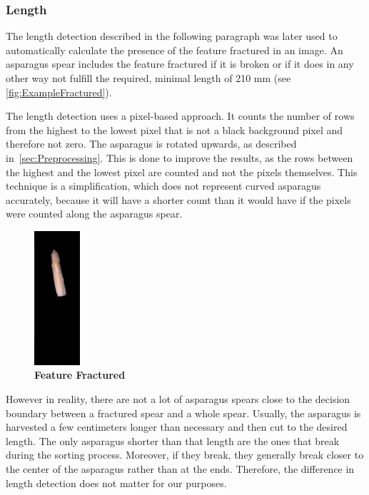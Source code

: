 \subsubsection{Length}
\label{subsec:Length}

The length detection described in the following paragraph was later used to automatically calculate the presence of the feature fractured in an image. An asparagus spear includes the feature fractured if it is broken or if it does in any other way not fulfill the required, minimal length of 210 mm (see \autoref{fig:ExampleFractured}). 

\bigskip
The length detection uses a pixel-based approach. It counts the number of rows from the highest to the lowest pixel that is not a black background pixel and therefore not zero. The asparagus is rotated upwards, as described in~\autoref{sec:Preprocessing}. This is done to improve the results, as the rows between the highest and the lowest pixel are counted and not the pixels themselves. This technique is a simplification, which does not represent curved asparagus accurately, because it will have a shorter count than it would have if the pixels were counted along the asparagus spear.

\begin{figure}
  \begin{center}
    \includegraphics[width=0.15\textwidth]{Figures/chapter03/example_img_fractured.png}
  \end{center}
  \vspace{-15pt}
  \caption[Example Image Feature Fractured]{ \textbf{Feature Fractured}}
  \label{fig:ExampleFractured}
\end{figure}

However in reality, there are not a lot of asparagus spears close to the decision boundary between a fractured spear and a whole spear. Usually, the asparagus is harvested a few centimeters longer than necessary and then cut to the desired length. The only asparagus shorter than that length are the ones that break during the sorting process. Moreover, if they break, they generally break closer to the center of the asparagus rather than at the ends. Therefore, the difference in length detection does not matter for our purposes.

